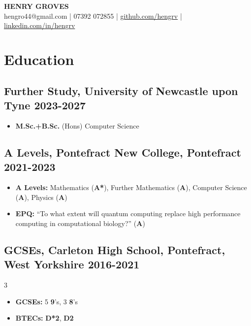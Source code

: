 \documentclass[9pt]{extarticle}
\makeatletter
\renewcommand{\maketitle}{
	\begin{center}
		{\huge\bfseries HENRY GROVES\\}
		\vspace{.5em}
		{\large hengro44@gmail.com | 07392 072855 | \href{https://github.com/hengrv}{github.com/hengrv} | \href{https://www.linkedin.com/in/hengrv/}{linkedin.com/in/hengrv}}
	\end{center}
}
\makeatother
\begin{document}
\thispagestyle{empty}
\maketitle

\vspace{-.2cm}
\begin{minipage}{0.97\textwidth}
	\section{Education}
	\subsection{Further Study, University of Newcastle upon Tyne \hfill 2023-2027}
	\vspace{-.2cm}
	\begin{itemize}
		\item \textbf{M.Sc.+B.Sc.} (Hons) Computer Science
	\end{itemize}
	\vspace{-.4cm}
	\subsection{A Levels, Pontefract New College, Pontefract \hfill 2021-2023}
	\vspace{-0.2cm}
	\begin{itemize}
		\item {\bfseries A Levels:} Mathematics (\textbf{A*}), Further Mathematics (\textbf{A}), Computer Science (\textbf{A}), Physics (\textbf{A})		      \vspace{-.1cm}
		\item {\bfseries EPQ: } ``To what extent will quantum computing replace high performance computing in computational biology?'' (\textbf{A})
	\end{itemize}
	\vspace{-.4cm}
	\normalsize
	\subsection{GCSEs, Carleton High School, Pontefract, West Yorkshire \hfill 2016-2021}
	\vspace{-0.6cm}
	\begin{multicols}{3}
		\begin{itemize}
			\item \textbf{GCSEs:} 5 \textbf{9}'s, 3 \textbf{8}'s
			\item \textbf{BTECs:} \textbf{D*2}, \textbf{D2}
		\end{itemize}
	\end{multicols}

\end{minipage}
\end{document}
